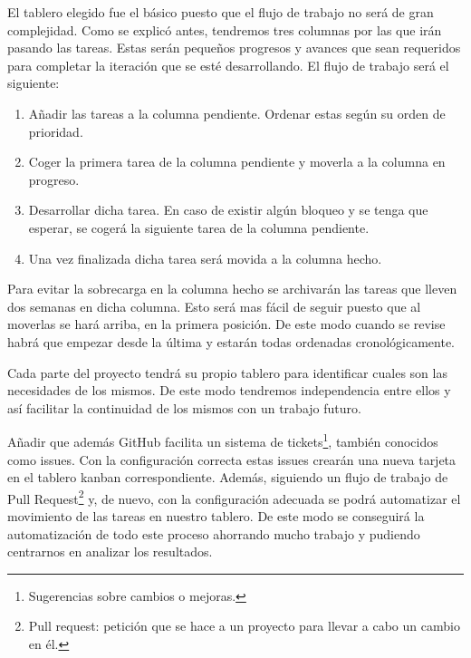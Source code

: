 El tablero elegido fue el básico puesto que el flujo de trabajo no será de gran complejidad.
Como se explicó antes, tendremos tres columnas por las que irán pasando las tareas. Estas serán pequeños progresos y avances que sean requeridos para completar la iteración
que se esté desarrollando. El flujo de trabajo será el siguiente:

\begin{enumerate}
  \item Añadir las tareas a la columna pendiente. Ordenar estas según su orden de prioridad.
  \item Coger la primera tarea de la columna pendiente y moverla a la columna en progreso.
  \item Desarrollar dicha tarea. En caso de existir algún bloqueo y se tenga que esperar,
    se cogerá la siguiente tarea de la columna pendiente.
  \item Una vez finalizada dicha tarea será movida a la columna hecho.
\end{enumerate}

Para evitar la sobrecarga en la columna hecho se archivarán las tareas que lleven dos semanas
en dicha columna. Esto será mas fácil de seguir puesto que al moverlas se hará arriba, en la primera
posición. De este modo cuando se revise habrá que empezar desde la última y estarán todas
ordenadas cronológicamente.

Cada parte del proyecto tendrá su propio tablero para identificar cuales son las necesidades de los mismos.
De este modo tendremos independencia entre ellos y así facilitar la continuidad de los mismos
con un trabajo futuro.

Añadir que además GitHub facilita un sistema de tickets\footnote{Sugerencias sobre cambios o mejoras.}, también conocidos como issues. Con la
configuración correcta estas issues crearán una nueva tarjeta en el tablero kanban correspondiente.
Además, siguiendo un flujo de trabajo de Pull Request\footnote{Pull request: petición que se hace a un proyecto para llevar a cabo un cambio en él.} y, de nuevo, con la configuración adecuada se
podrá automatizar el movimiento de las tareas en nuestro tablero. De este modo se conseguirá la
automatización de todo este proceso ahorrando mucho trabajo y pudiendo centrarnos en analizar los
resultados.
